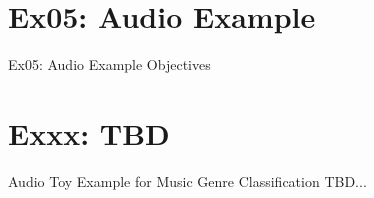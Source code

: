 \documentclass[mathserif, aspectratio=1610]{intbeamer}
\begin{document}
\section{Ex05: Audio Example}
\begin{frame}{Ex05: Audio Example}
Objectives
\end{frame}






\section{Exxx: TBD}
\begin{frame}{Audio Toy Example for Music Genre Classification}
TBD...
\end{frame}





\end{document}

